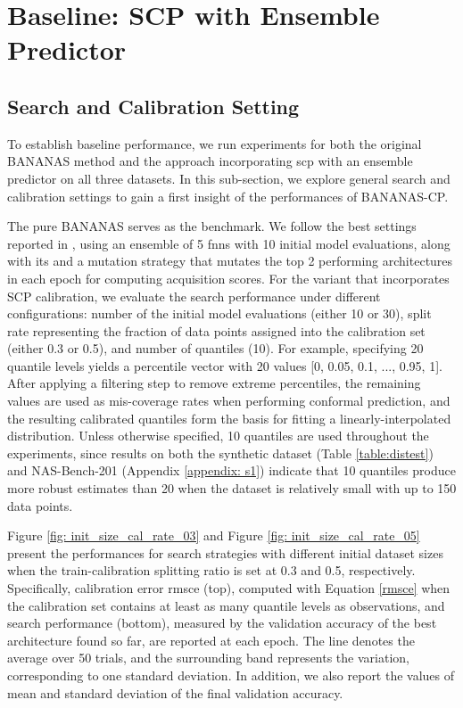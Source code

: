 \documentclass[a4paper,oneside,bibliography=totoc]{scrbook}
\begin{document}
\section{Baseline: SCP with Ensemble Predictor}
\label{sec: baseline}

\subsection{Search and Calibration Setting}
\label{sec: sc_setting}
To establish baseline performance, we run experiments for both the original BANANAS method and the approach incorporating \gls{scp} with an ensemble predictor on all three datasets. In this sub-section, we explore general search and calibration settings to gain a first insight of the performances of BANANAS-CP.

The pure BANANAS serves as the benchmark. We follow the best settings reported in \cite{white2019bananas}, using an ensemble of 5 \gls{fnns} with 10 initial model evaluations, along with \gls{its} and a mutation strategy that mutates the top 2 performing architectures in each epoch for computing acquisition scores. For the variant that incorporates SCP calibration, we evaluate the search performance under different configurations: number of the initial model evaluations (either 10 or 30), split rate representing the fraction of data points assigned into the calibration set (either 0.3 or 0.5), and number of quantiles (10). For example, specifying 20 quantile levels yields a percentile vector with 20 values [0, 0.05, 0.1, ..., 0.95, 1]. After applying a filtering step to remove extreme percentiles, the remaining values are used as mis-coverage rates when performing conformal prediction, and the resulting calibrated quantiles form the basis for fitting a linearly-interpolated distribution. Unless otherwise specified, 10 quantiles are used throughout the experiments, since results on both the synthetic dataset (Table \ref{table:distest}) and NAS-Bench-201 (Appendix \ref{appendix: s1}) indicate that 10 quantiles produce more robust estimates than 20 when the dataset is relatively small with up to 150 data points.

Figure \ref{fig: init_size_cal_rate_03} and Figure \ref{fig: init_size_cal_rate_05} present the performances for search strategies with different initial dataset sizes when the train-calibration splitting ratio is set at 0.3 and 0.5, respectively. Specifically, calibration error \gls{rmsce} (top), computed with Equation \ref{rmsce} when the calibration set contains at least as many quantile levels as observations, and search performance (bottom), measured by the validation accuracy of the best architecture found so far, are reported at each epoch. The line denotes the average over 50 trials, and the surrounding band represents the variation, corresponding to one standard deviation. In addition, we also report the values of mean and standard deviation of the final validation accuracy.
\end{document}
